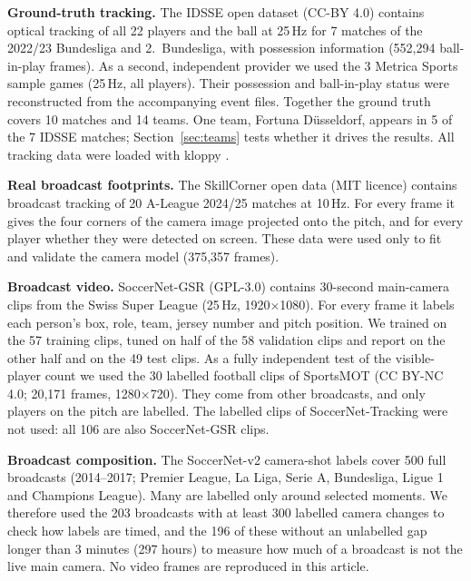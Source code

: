 \documentclass[]{interact}
\begin{document}
\textbf{Ground-truth tracking.} The IDSSE open dataset \citep{bassek2025idsse} (CC-BY 4.0) contains optical tracking
of all 22 players and the ball at 25\,Hz for 7 matches of the 2022/23 Bundesliga and 2.~Bundesliga, with possession
information (552{,}294 ball-in-play frames). As a second, independent provider we used the 3 Metrica Sports sample
games \citep{metrica_sample} (25\,Hz, all players). Their possession and ball-in-play status were reconstructed from
the accompanying event files. Together the ground truth covers 10 matches and 14 teams. One team, Fortuna
D\"usseldorf, appears in 5 of the 7 IDSSE matches; Section~\ref{sec:teams} tests whether it drives the results. All
tracking data were loaded with kloppy \citep{kloppy}.

\textbf{Real broadcast footprints.} The SkillCorner open data \citep{skillcorner_opendata} (MIT licence) contains
broadcast tracking of 20 A-League 2024/25 matches at 10\,Hz. For every frame it gives the four corners of the camera
image projected onto the pitch, and for every player whether they were detected on screen. These data were used only
to fit and validate the camera model (375{,}357 frames).

\textbf{Broadcast video.} SoccerNet-GSR \citep{somers2024gsr} (GPL-3.0) contains 30-second main-camera clips from the
Swiss Super League (25\,Hz, 1920$\times$1080). For every frame it labels each person's box, role, team, jersey number
and pitch position. We trained on the 57 training clips, tuned on half of the 58 validation clips and report on the
other half and on the 49 test clips. As a fully independent test of the visible-player count we used the 30 labelled
football clips of SportsMOT \citep{cui2023sportsmot} (CC BY-NC 4.0; 20{,}171 frames, 1280$\times$720). They come
from other broadcasts, and only players on the pitch are labelled. The labelled clips of SoccerNet-Tracking were not
used: all 106 are also SoccerNet-GSR clips.

\textbf{Broadcast composition.} The SoccerNet-v2 camera-shot labels \citep{deliege2021soccernetv2} cover 500 full
broadcasts (2014--2017; Premier League, La Liga, Serie A, Bundesliga, Ligue 1 and Champions League). Many are labelled
only around selected moments. We therefore used the 203 broadcasts with at least 300 labelled camera changes to check
how labels are timed, and the 196 of these without an unlabelled gap longer than 3 minutes (297 hours) to measure how
much of a broadcast is not the live main camera. No video frames are reproduced in this article.
\end{document}
